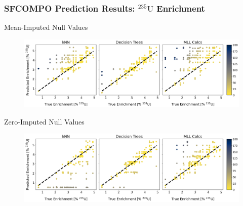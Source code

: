 \begin{frame}
  \frametitle{SFCOMPO Prediction Results: ${}^{235}\text{U}$ Enrichment}
  \vspace{-5pt}
  \begin{block}{Mean-Imputed Null Values}
    \begin{figure}
      \centering
      \includegraphics[height=0.35\textheight]{./figures/sfcompo_truey_vs_predy_impnull__enri.png}
    \end{figure}
  \end{block}
  \vspace{-5pt}
  \begin{block}{Zero-Imputed Null Values}
    \begin{figure}
      \centering
      \includegraphics[height=0.35\textheight]{./figures/sfcompo_truey_vs_predy_0null__enri.png}
    \end{figure}
  \end{block}
\end{frame}

